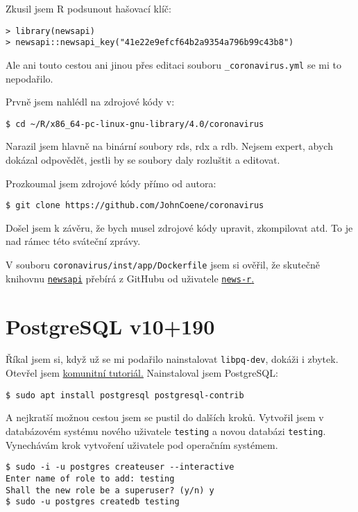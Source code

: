 Zkusil jsem R podsunout hašovací klíč:
\begin{lstlisting}
> library(newsapi)
> newsapi::newsapi_key("41e22e9efcf64b2a9354a796b99c43b8")
\end{lstlisting}

Ale ani touto cestou ani jinou přes editaci souboru \texttt{\_coronavirus.yml} se mi to nepodařilo.

Prvně jsem nahlédl na zdrojové kódy v:
\begin{lstlisting}
$ cd ~/R/x86_64-pc-linux-gnu-library/4.0/coronavirus
\end{lstlisting}

Narazil jsem hlavně na binární soubory rds, rdx a rdb. Nejsem expert, abych dokázal odpovědět, jestli by se soubory daly rozluštit a editovat.

Prozkoumal jsem zdrojové kódy přímo od autora:
\begin{lstlisting}
$ git clone https://github.com/JohnCoene/coronavirus
\end{lstlisting}

Došel jsem k závěru, že bych musel zdrojové kódy upravit, zkompilovat atd. To je nad rámec této sváteční zprávy. 

V souboru \texttt{coronavirus/inst/app/Dockerfile} jsem si ověřil, že skutečně knihovnu 
\href{https://github.com/news-r/newsapi}{\texttt{newsapi}} přebírá z GitHubu od uživatele 
\href{https://github.com/news-r}{\texttt{news-r}.}




\section{PostgreSQL v10+190}

Říkal jsem si, když už se mi podařilo nainstalovat \texttt{libpq-dev}, dokáži i zbytek. Otevřel jsem \href{https://www.digitalocean.com/community/tutorials/how-to-install-and-use-postgresql-on-ubuntu-18-04}{komunitní tutoriál.} Nainstaloval jsem PostgreSQL:
\begin{lstlisting}
$ sudo apt install postgresql postgresql-contrib
\end{lstlisting}

A nejkratší možnou cestou jsem se pustil do dalších kroků. Vytvořil jsem v databázovém systému nového uživatele \texttt{testing} a novou databázi \texttt{testing}. Vynechávám krok vytvoření uživatele pod operačním systémem.
\begin{lstlisting}
$ sudo -i -u postgres createuser --interactive
Enter name of role to add: testing
Shall the new role be a superuser? (y/n) y
$ sudo -u postgres createdb testing
\end{lstlisting}

